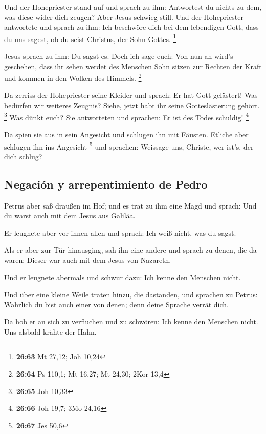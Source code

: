  Und der Hohepriester stand auf und sprach zu ihm:
Antwortest du nichts zu dem, was diese wider dich zeugen?
 Aber Jesus schwieg still. Und der Hohepriester
antwortete und sprach zu ihm: Ich beschwöre dich bei dem lebendigen
Gott, dass du uns sagest, ob du seist Christus, der Sohn Gottes.
\footnote{\textbf{26:63} Mt 27,12; Joh 10,24}

 Jesus sprach zu ihm: Du sagst es. Doch ich sage euch:
Von nun an wird's geschehen, dass ihr sehen werdet des Menschen Sohn
sitzen zur Rechten der Kraft und kommen in den Wolken des Himmels.
\footnote{\textbf{26:64} Ps 110,1; Mt 16,27; Mt 24,30; 2Kor 13,4}

 Da zerriss der Hohepriester seine Kleider und sprach: Er
hat Gott gelästert! Was bedürfen wir weiteres Zeugnis? Siehe, jetzt habt
ihr seine Gotteslästerung gehört. \footnote{\textbf{26:65} Joh 10,33}
 Was dünkt euch? Sie antworteten und sprachen: Er ist des
Todes schuldig! \footnote{\textbf{26:66} Joh 19,7; 3Mo 24,16}

 Da spien sie aus in sein Angesicht und schlugen ihn mit
Fäusten. Etliche aber schlugen ihn ins Angesicht \footnote{\textbf{26:67}
  Jes 50,6}  und sprachen: Weissage uns, Christe, wer
ist's, der dich schlug?

\hypertarget{negaciuxf3n-y-arrepentimiento-de-pedro}{%
\subsection{Negación y arrepentimiento de
Pedro}\label{negaciuxf3n-y-arrepentimiento-de-pedro}}

 Petrus aber saß draußen im Hof; und es trat zu ihm eine
Magd und sprach: Und du warst auch mit dem Jesus aus Galiläa.

 Er leugnete aber vor ihnen allen und sprach: Ich weiß
nicht, was du sagst.

 Als er aber zur Tür hinausging, sah ihn eine andere und
sprach zu denen, die da waren: Dieser war auch mit dem Jesus von
Nazareth.

 Und er leugnete abermals und schwur dazu: Ich kenne den
Menschen nicht.

 Und über eine kleine Weile traten hinzu, die dastanden,
und sprachen zu Petrus: Wahrlich du bist auch einer von denen; denn
deine Sprache verrät dich.

 Da hob er an sich zu verfluchen und zu schwören: Ich
kenne den Menschen nicht. Uns alsbald krähte der Hahn.

